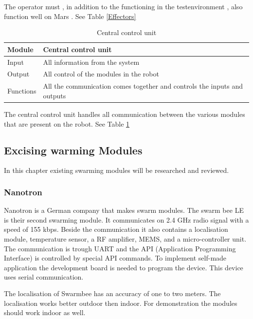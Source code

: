\documentclass[10pt,a4paper]{article}
\begin{document}
The operator must , in addition to the functioning in the testenvironment , also function well on Mars . See Table \ref{Effectors} \\

\begin{table}[H]
\centering
\caption{Central control unit}
\label{control}
\begin{tabular}{|l|l|}
\hline
Module    & Central control unit \\ \hline
Input  & All information from the system  \\ \hline
Output & All control of the modules in the robot \\ \hline
Functions  & All the communication comes together and controls the inputs and outputs            \\ \hline
\end{tabular}
\end{table}

The central control unit handles all communication between the various modules that are present on the robot. See Table \ref{control}



\newpage
\subsection{Excising warming Modules}

In this chapter existing swarming modules will be researched and reviewed.

\subsubsection{Nanotron}

Nanotron is a German company that makes swarm modules. The swarm bee LE is their second swarming module. It communicates on 2.4 GHz radio signal with a speed of 155 kbps. Beside the communication it also contains a localisation module, temperature sensor, a RF amplifier, MEMS, and a micro-controller unit. The communication is trough UART and the API (Application Programming Interface) is controlled by special API commands. To implement self-made application the development board is needed to program the device. This device uses serial communication. 

The localisation of Swarmbee has an accuracy of one to two meters. The localisation works better outdoor then indoor. For demonstration the modules should work indoor as well. \cite{etotaal}
\end{document}
